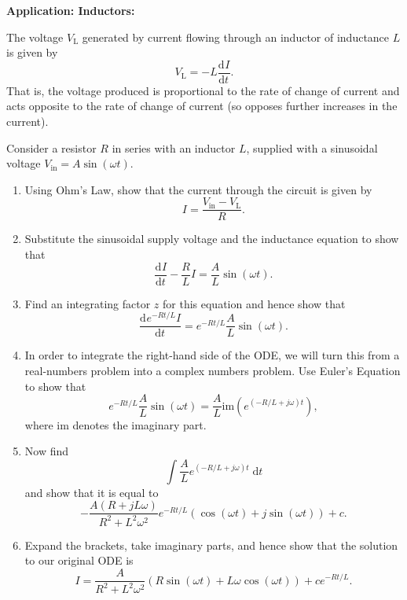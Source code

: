 \documentclass{article}
\newcommand{\deriv}[3][]{\frac{\mathrm{d}^{#1}#2}{\mathrm{d}#3^{#1}}}
\newcommand{\diff}{\;\mathrm{d}}
\begin{document}
\clearpage





\textbf{Application: Inductors:}\bigskip


The voltage $V_\mathrm{L}$ generated by current flowing through an inductor of inductance $L$ is given by
\[V_\mathrm{L}=-L\deriv{I}{t}.\]
That is, the voltage produced is proportional to the rate of change of current and acts opposite to the rate of change of current (so opposes further increases in the current).

Consider a resistor $R$ in series with an inductor $L$, supplied with a sinusoidal voltage $V_\mathrm{in}=A\sin(\omega t)$.

\begin{enumerate}
	\item Using Ohm's Law, show that the current through the circuit is given by
		\[I=\frac{V_\mathrm{in}-V_\mathrm{L}}{R}.\]
	\item Substitute the sinusoidal supply voltage and the inductance equation to show that
		\[\deriv{I}{t}-\frac{R}{L}I = \frac{A}{L}\sin(\omega t).\]
	\item Find an integrating factor $z$ for this equation and hence show that
		\[\deriv{e^{-Rt/L}I}{t}=e^{-Rt/L}\frac{A}{L}\sin(\omega t).\]
	\item In order to integrate the right-hand side of the ODE, we will turn this from a real-numbers problem into a complex numbers problem. Use Euler's Equation to show that
		\[e^{-Rt/L}\frac{A}{L}\sin(\omega t) = \frac{A}{L}\mathrm{im}\left(e^{(-R/L+j\omega)t}\right),\]
		where $\mathrm{im}$ denotes the imaginary part.
	\item Now find
		\[\int \frac{A}{L}e^{(-R/L+j\omega)t}\diff t\]
		and show that it is equal to
		\[-\frac{A(R+jL\omega)}{R^2+L^2\omega^2}e^{-Rt/L}\left(\cos(\omega t) + j\sin(\omega t)\right)+c.\]
	\item Expand the brackets, take imaginary parts, and hence show that the solution to our original ODE is
		\[I=\frac{A}{R^2+L^2\omega^2}\left(R\sin(\omega t)+L\omega\cos(\omega t)\right) + ce^{-Rt/L}.\]
\end{enumerate}















\clearpage
\end{document}
